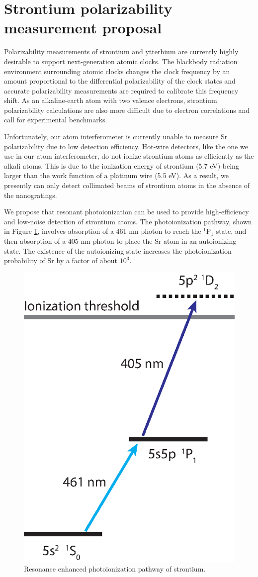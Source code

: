 \pagebreak
\section{Strontium polarizability measurement proposal}
Polarizability measurements of strontium and ytterbium are currently highly desirable to support next-generation atomic clocks. The blackbody radiation environment surrounding atomic clocks changes the clock frequency by an amount proportional to the differential polarizability of the clock states and accurate polarizability measurements are required to calibrate this frequency shift. As an alkaline-earth atom with two valence electrons, strontium polarizability calculations are also more difficult due to electron correlations and call for experimental benchmarks. 


Unfortunately, our atom interferometer is currently unable to measure Sr polarizability due to low detection efficiency. Hot-wire detectors, like the one we use in our atom interferometer, do not ionize strontium atoms as efficiently as the alkali atoms. This is due to the ionization energy of strontium (5.7 eV) being larger than the work function of a platinum wire (5.5 eV). As a result, we presently can only detect collimated beams of strontium atoms in the absence of the nanogratings.


We propose that resonant photoionization can be used to provide high-efficiency and low-noise detection of strontium atoms. The photoionization pathway, shown in Figure \ref{srLevelsSimple}, involves absorption of a 461 nm photon to reach the $^1\textrm{P}_1$ state, and then absorption of a 405 nm photon to place the Sr atom in an autoionizing state. The existence of the autoionizing state increases the photoionization probability of Sr by a factor of about $10^3$.


\begin{figure}
\centerline{\includegraphics[width=.4\textwidth]{Figures/srLevelDiagramSimple.eps}}
\caption{\label{srLevelsSimple}Resonance enhanced photoionization pathway of strontium.}
\end{figure}


